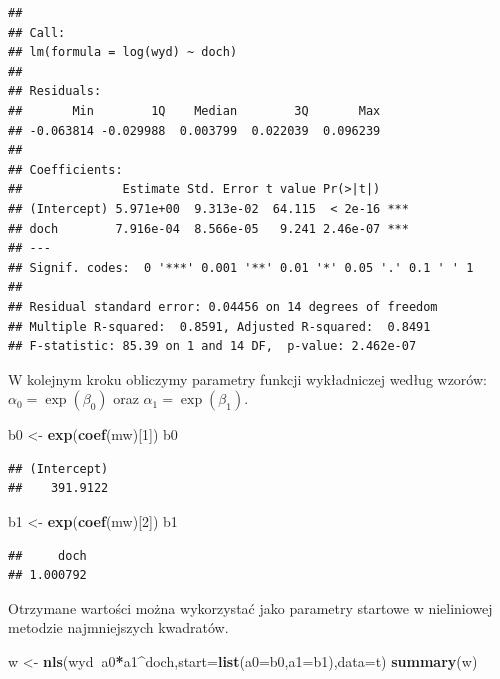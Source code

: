 \documentclass[polish,]{book}
\newenvironment{Shaded}{\begin{snugshade}}{\end{snugshade}}
\newcommand{\DataTypeTok}[1]{\textcolor[rgb]{0.13,0.29,0.53}{#1}}
\newcommand{\DecValTok}[1]{\textcolor[rgb]{0.00,0.00,0.81}{#1}}
\newcommand{\KeywordTok}[1]{\textcolor[rgb]{0.13,0.29,0.53}{\textbf{#1}}}
\newcommand{\NormalTok}[1]{#1}
\newcommand{\OperatorTok}[1]{\textcolor[rgb]{0.81,0.36,0.00}{\textbf{#1}}}
\newcommand{\StringTok}[1]{\textcolor[rgb]{0.31,0.60,0.02}{#1}}
\begin{document}
\begin{verbatim}
## 
## Call:
## lm(formula = log(wyd) ~ doch)
## 
## Residuals:
##       Min        1Q    Median        3Q       Max 
## -0.063814 -0.029988  0.003799  0.022039  0.096239 
## 
## Coefficients:
##              Estimate Std. Error t value Pr(>|t|)    
## (Intercept) 5.971e+00  9.313e-02  64.115  < 2e-16 ***
## doch        7.916e-04  8.566e-05   9.241 2.46e-07 ***
## ---
## Signif. codes:  0 '***' 0.001 '**' 0.01 '*' 0.05 '.' 0.1 ' ' 1
## 
## Residual standard error: 0.04456 on 14 degrees of freedom
## Multiple R-squared:  0.8591, Adjusted R-squared:  0.8491 
## F-statistic: 85.39 on 1 and 14 DF,  p-value: 2.462e-07
\end{verbatim}

W kolejnym kroku obliczymy parametry funkcji wykładniczej według wzorów: \(\alpha_0=\exp(\beta_0)\) oraz \(\alpha_1=\exp(\beta_1)\).

\begin{Shaded}
\begin{Highlighting}[]
\NormalTok{b0 <-}\StringTok{ }\KeywordTok{exp}\NormalTok{(}\KeywordTok{coef}\NormalTok{(mw)[}\DecValTok{1}\NormalTok{])}
\NormalTok{b0}
\end{Highlighting}
\end{Shaded}

\begin{verbatim}
## (Intercept) 
##    391.9122
\end{verbatim}

\begin{Shaded}
\begin{Highlighting}[]
\NormalTok{b1 <-}\StringTok{ }\KeywordTok{exp}\NormalTok{(}\KeywordTok{coef}\NormalTok{(mw)[}\DecValTok{2}\NormalTok{])}
\NormalTok{b1}
\end{Highlighting}
\end{Shaded}

\begin{verbatim}
##     doch 
## 1.000792
\end{verbatim}

Otrzymane wartości można wykorzystać jako parametry startowe w nieliniowej metodzie najmniejszych kwadratów.

\begin{Shaded}
\begin{Highlighting}[]
\NormalTok{w <-}\StringTok{ }\KeywordTok{nls}\NormalTok{(wyd}\OperatorTok{~}\NormalTok{a0}\OperatorTok{*}\NormalTok{a1}\OperatorTok{^}\NormalTok{doch,}\DataTypeTok{start=}\KeywordTok{list}\NormalTok{(}\DataTypeTok{a0=}\NormalTok{b0,}\DataTypeTok{a1=}\NormalTok{b1),}\DataTypeTok{data=}\NormalTok{t)}
\KeywordTok{summary}\NormalTok{(w)}
\end{Highlighting}
\end{Shaded}
\end{document}
